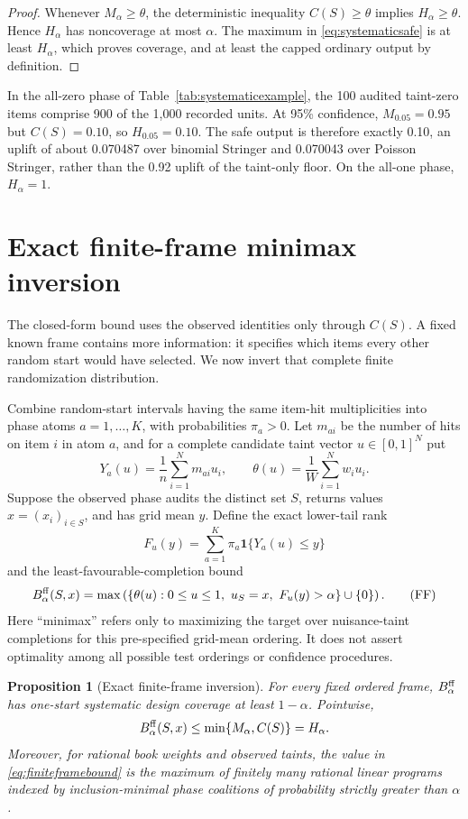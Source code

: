 \documentclass[11pt]{article}
\newtheorem{proposition}[theorem]{Proposition}
\theoremstyle{definition}
\begin{document}
\begin{proof}
Whenever $M_\alpha\ge\theta$, the deterministic inequality
$C(S)\ge\theta$ implies $H_\alpha\ge\theta$. Hence $H_\alpha$ has
noncoverage at most $\alpha$. The maximum in \eqref{eq:systematicsafe} is at
least $H_\alpha$, which proves coverage, and at least the capped ordinary
output by definition.
\end{proof}

In the all-zero phase of Table~\ref{tab:systematicexample}, the 100 audited
taint-zero items comprise 900 of the 1,000 recorded units. At 95\% confidence,
$M_{0.05}=0.95$ but $C(S)=0.10$, so $H_{0.05}=0.10$. The safe output is
therefore exactly 0.10, an uplift of about 0.070487 over binomial Stringer and
0.070043 over Poisson Stringer, rather than the 0.92 uplift of the taint-only
floor. On the all-one phase, $H_\alpha=1$.

\section{Exact finite-frame minimax inversion}
\label{sec:finite-frame}

The closed-form bound uses the observed identities only through $C(S)$. A
fixed known frame contains more information: it specifies which items every
other random start would have selected. We now invert that complete finite
randomization distribution.

Combine random-start intervals having the same item-hit multiplicities into
phase atoms $a=1,\ldots,K$, with probabilities $\pi_a>0$. Let $m_{ai}$ be
the number of hits on item $i$ in atom $a$, and for a complete candidate
taint vector $u\in[0,1]^N$ put
\[
 Y_a(u)=\frac1n\sum_{i=1}^N m_{ai}u_i,
 \qquad
 \theta(u)=\frac1W\sum_{i=1}^Nw_iu_i.
\]
Suppose the observed phase audits the distinct set $S$, returns values
$x=(x_i)_{i\in S}$, and has grid mean $y$. Define the exact lower-tail rank
\[
 F_u(y)=\sum_{a=1}^K\pi_a\mathbf 1\{Y_a(u)\le y\}
\]
and the least-favourable-completion bound
\begin{equation*}\label{eq:finiteframebound}
 B^{\rm ff}_\alpha(S,x)
 =\max\left(
 \left\{\theta(u):0\le u\le1,\ u_S=x,\ F_u(y)>\alpha\right\}
 \cup\{0\}
 \right).
\tag{FF}
\end{equation*}
Here ``minimax'' refers only to maximizing the target over nuisance-taint
completions for this pre-specified grid-mean ordering. It does not assert
optimality among all possible test orderings or confidence procedures.

\begin{proposition}[Exact finite-frame inversion]
\label{prop:systematicminimax}
For every fixed ordered frame, $B^{\rm ff}_\alpha$ has one-start systematic
design coverage at least $1-\alpha$. Pointwise,
\begin{equation}\label{eq:finiteframedominance}
 B^{\rm ff}_\alpha(S,x)
 \le \min\{M_\alpha,C(S)\}=H_\alpha.
\end{equation}
Moreover, for rational book weights and observed taints, the value in
\eqref{eq:finiteframebound} is the maximum of finitely many rational linear
programs indexed by inclusion-minimal phase coalitions of probability
strictly greater than $\alpha$.
\end{proposition}
\end{document}
